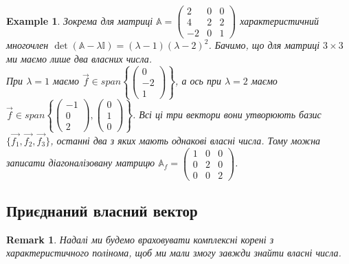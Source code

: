 \documentclass[a4paper, 10pt]{article}
\theoremstyle{theoremdd}
\newtheorem{example}[theorem]{Example}
\newtheorem{remark}[theorem]{Remark}
\begin{document}
\begin{example}
Зокрема для матриці $\mathbb{A} = \begin{pmatrix}
2 & 0 & 0 \\
4 & 2 & 2 \\
-2 & 0 & 1
\end{pmatrix}$ характеристичний многочлен $\det (\mathbb{A}-\lambda \mathbb{I}) = (\lambda-1)(\lambda-2)^2$. Бачимо, що для матриці $3 \times 3$ ми маємо лише два власних числа.\\
При $\lambda = 1$ маємо $\vec{f} \in span \left\{ \begin{pmatrix}
0 \\ -2 \\ 1
\end{pmatrix} \right\}$, а ось при $\lambda = 2$ маємо $\vec{f} \in span \left\{ \begin{pmatrix}
-1 \\ 0 \\ 2
\end{pmatrix}, \begin{pmatrix}
0 \\ 1 \\ 0
\end{pmatrix} \right\}$. Всі ці три вектори вони утворюють базис $\{\vec{f_1},\vec{f_2},\vec{f_3} \}$, останні два з яких мають однакові власні числа. Тому можна записати діагоналізовану матрицю $\mathbb{A}_f = \begin{pmatrix}
1 & 0 & 0 \\
0 & 2 & 0 \\
0 & 0 & 2
\end{pmatrix}$.
\end{example}

\subsection{Приєднаний власний вектор}
\begin{remark}
Надалі ми будемо враховувати комплексні корені з характеристичного полінома, щоб ми мали змогу завжди знайти власні числа.
\end{remark}
\end{document}
